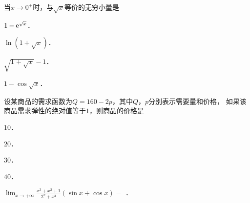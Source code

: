 \documentclass[plain,noanswer,medmath]{../../template/jnuexam}
\begin{document}






\begin{problem}
当$x \to 0^+$时，与$\sqrt{x}$等价的无穷小量是\pickout{}
\begin{abcd}
\item $1 - \mathrm{e}^{\sqrt{x}}$．
\item $\ln (1 + \sqrt{x})$．
\item $\sqrt{1^{} + \sqrt{x}} - 1$．
\item $1 - \cos \sqrt{x}$．
\end{abcd}
\end{problem}








\begin{problem}
设某商品的需求函数为$Q = 160 - 2p$，其中$Q$，$p$分别表示需要量和价格，
如果该商品需求弹性的绝对值等于$1$，则商品的价格是\pickout{}
\begin{abcd}
\item $10$．
\item $20$．
\item $30$．
\item $40$．
\end{abcd}
\end{problem}














\begin{problem}
$\lim_{x \to +\infty} \frac{x^3 + x^2 + 1}{2^x + x^3}(\sin x + \cos x) =$ \fillin{}．
\end{problem}




\end{document}
